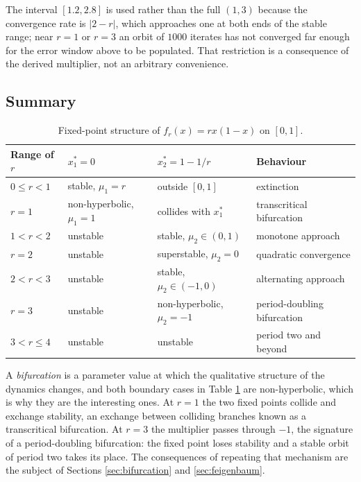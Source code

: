 \documentclass[11pt,a4paper]{article}
\theoremstyle{definition}
\theoremstyle{remark}
\newcommand{\logmap}{f_r}
\begin{document}
The interval $[1.2, 2.8]$ is used rather than the full $(1,3)$ because the
convergence rate is $|2-r|$, which approaches one at both ends of the stable
range; near $r=1$ or $r=3$ an orbit of $1000$ iterates has not converged far
enough for the error window above to be populated. That restriction is a
consequence of the derived multiplier, not an arbitrary convenience.

\subsection{Summary}

\begin{table}[H]
\centering
\begin{tabular}{llll}
\toprule
Range of $r$ & $x_1^{*}=0$ & $x_2^{*}=1-1/r$ & Behaviour \\
\midrule
$0\le r<1$ & stable, $\mu_1=r$ & outside $[0,1]$ & extinction \\
$r=1$ & non-hyperbolic, $\mu_1=1$ & collides with $x_1^{*}$ & transcritical bifurcation \\
$1<r<2$ & unstable & stable, $\mu_2\in(0,1)$ & monotone approach \\
$r=2$ & unstable & superstable, $\mu_2=0$ & quadratic convergence \\
$2<r<3$ & unstable & stable, $\mu_2\in(-1,0)$ & alternating approach \\
$r=3$ & unstable & non-hyperbolic, $\mu_2=-1$ & period-doubling bifurcation \\
$3<r\le4$ & unstable & unstable & period two and beyond \\
\bottomrule
\end{tabular}
\caption{Fixed-point structure of $\logmap(x)=rx(1-x)$ on $[0,1]$.}
\label{tab:regimes}
\end{table}

A \emph{bifurcation} is a parameter value at which the qualitative structure
of the dynamics changes, and both boundary cases in Table \ref{tab:regimes}
are non-hyperbolic, which is why they are the interesting ones. At $r=1$ the
two fixed points collide and exchange stability, an exchange between colliding
branches known as a transcritical bifurcation. At $r=3$ the multiplier passes
through $-1$, the signature of a period-doubling bifurcation: the fixed point
loses stability and a stable orbit of period two takes its place. The
consequences of repeating that mechanism are the subject of Sections
\ref{sec:bifurcation} and \ref{sec:feigenbaum}.
\end{document}
